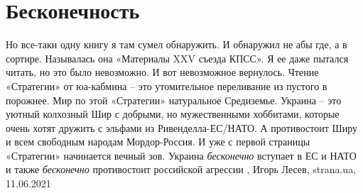  
 
 
 
 
\chapter{Бесконечность}

Но все-таки одну книгу я там сумел обнаружить. И обнаружил не абы где, а в
сортире. Называлась она «Материалы XXV съезда КПСС». Я ее даже пытался читать,
но это было невозможно. И вот невозможное вернулось. Чтение «Стратегии» от
юа-кабмина – это утомительное переливание из пустого в порожнее.  Мир по этой
«Стратегии» натуральное Средиземье. Украина – это уютный колхозный Шир с
добрыми, но мужественными хоббитами, которые очень хотят дружить с эльфами из
Ривенделла-ЕС/НАТО. А противостоит Ширу и всем свободным народам Мордор-Россия.
И уже с первой страницы «Стратегии» начинается вечный зов. Украина
\emph{бесконечно} вступает в ЕС и НАТО и также \emph{бесконечно} противостоит
российской агрессии
, Игорь Лесев, strana.ua, 11.06.2021 

